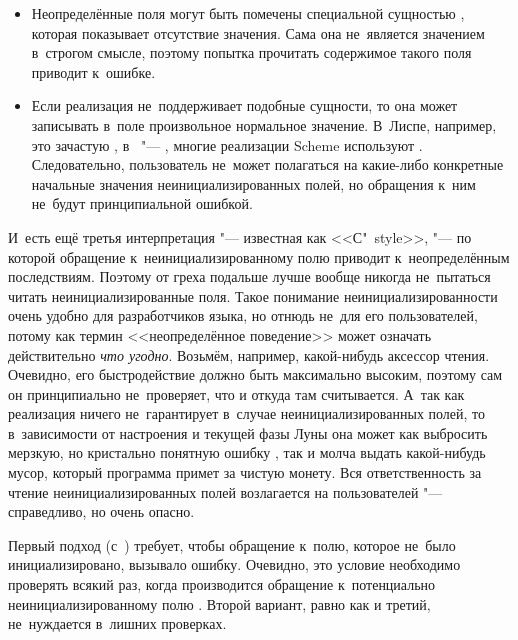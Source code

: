 \begin{itemize}
  \item {}
        Неопределённые поля могут быть помечены специальной сущностью
        , которая показывает отсутствие значения.
        Сама она не~является значением в~строгом смысле, поэтому попытка
        прочитать содержимое такого поля приводит к~ошибке.

  \item Если реализация не~поддерживает подобные сущности, то она
        может записывать в~поле произвольное нормальное значение.
        В~Лиспе, например, это зачастую , в~{\LeLisp} "---
        , многие реализации Scheme используют .
        Следовательно, пользователь не~может полагаться на какие-либо
        конкретные начальные значения неинициализированных полей, но
        обращения к~ним не~будут принципиальной ошибкой.
\end{itemize}

И~есть ещё третья интерпретация "--- известная как <<С"~style>>, "--- по которой
обращение к~неинициализированному полю приводит к~неопределённым последствиям.
Поэтому от греха подальше лучше вообще никогда не~пытаться читать
неинициализированные поля. Такое понимание неинициализированности очень удобно
для разработчиков языка, но отнюдь не~для его пользователей, потому как термин
<<неопределённое поведение>> может означать действительно \emph{что угодно}.
Возьмём, например, какой-нибудь аксессор чтения. Очевидно, его быстродействие
должно быть максимально высоким, поэтому сам он принципиально не~проверяет, что
и откуда там считывается. А~так как реализация ничего не~гарантирует в~случае
неинициализированных полей, то в~зависимости от настроения и текущей фазы
Луны она может как выбросить мерзкую, но кристально понятную ошибку , так и молча выдать какой-нибудь мусор, который программа
примет за чистую монету. Вся ответственность за чтение неинициализированных
полей возлагается на пользователей "--- справедливо, но очень опасно.

Первый подход (с~) требует, чтобы обращение к~полю,
которое не~было инициализировано, вызывало ошибку. Очевидно, это условие
необходимо проверять всякий раз, когда производится обращение к~потенциально
неинициализированному полю \cite{que93b}. Второй вариант, равно как и третий,
не~нуждается в~лишних проверках.

